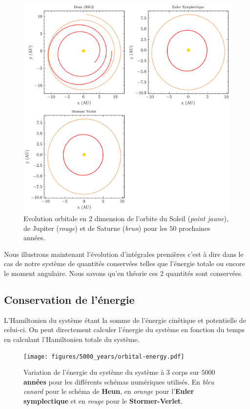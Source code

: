 \documentclass[11pt,twoside=semi,openright,numbers=noenddot]{article}
\begin{document}
\begin{figure}[H]
  \centering
  \includegraphics{figures/50_years/orbital-plot2d.png}
  \caption{Evolution orbitale en 2 dimension de l'orbite du Soleil (\emph{point jaune}), de Jupiter (\emph{rouge}) et de Saturne (\emph{brun}) pour les $50$ prochaines années.}
  \label{fig:plot2D--50}
\end{figure}

Nous illustrons maintenant l'évolution d'intégrales premières c'est à dire dans le cas de notre système de quantités conservées telles que l'énergie totale ou encore le moment angulaire. Nous savons qu'en théorie ces 2 quantités sont conservées.

\subsection{Conservation de l'énergie}

L'Hamiltonien du système étant la somme de l'énergie cinétique et potentielle de celui-ci. On peut directement calculer l'énergie du système en fonction du temps en calculant l'Hamiltonien totale du système.

\begin{figure}[H]
    \centering
    \texttt{[image: figures/5000\_years/orbital-energy.pdf]}
    \caption{Variation de l'énergie du système du système à 3 corps sur \textbf{$5000$ années} pour les différents schémas numériques utilisés. En \emph{bleu canard} pour le schéma de \textbf{Heun}, en \emph{orange} pour l'\textbf{Euler symplectique} et en \emph{rouge} pour le \textbf{Stormer-Verlet}.}
    \label{fig:orbital-energy--5000}
\end{figure}
\end{document}
